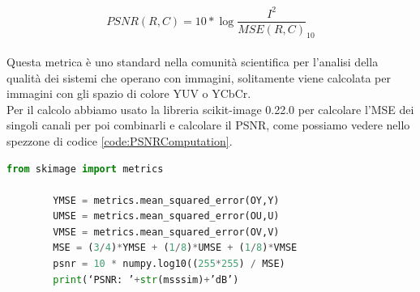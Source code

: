 \begin{equation}\label{eq:PSNR}
    PSNR(R,C)  =  10 * \log{\dfrac{I^2}{MSE(R,C)}}_{10}
\end{equation}\\
Questa metrica è uno standard nella comunità scientifica per l’analisi della qualità dei sistemi che operano con immagini, solitamente viene calcolata per immagini con gli spazio di colore YUV o YCbCr.\\
Per il calcolo abbiamo usato la libreria scikit-image 0.22.0 per calcolare l’MSE dei singoli canali per poi combinarli e calcolare il PSNR, come possiamo vedere nello spezzone di codice \ref{code:PSNRComputation}.\\
\begin{adjustbox}{max width=\textwidth}
    \begin{lstlisting}[language=Python, caption=Spezzone di codice per il calcolo del PSNR pesato, label=code:PSNRComputation]
        from skimage import metrics
        
        YMSE = metrics.mean_squared_error(OY,Y)
        UMSE = metrics.mean_squared_error(OU,U)
        VMSE = metrics.mean_squared_error(OV,V)
        MSE = (3/4)*YMSE + (1/8)*UMSE + (1/8)*VMSE
        psnr = 10 * numpy.log10((255*255) / MSE)
        print(‘PSNR: ’+str(msssim)+’dB’)
    \end{lstlisting}
\end{adjustbox}   
    

